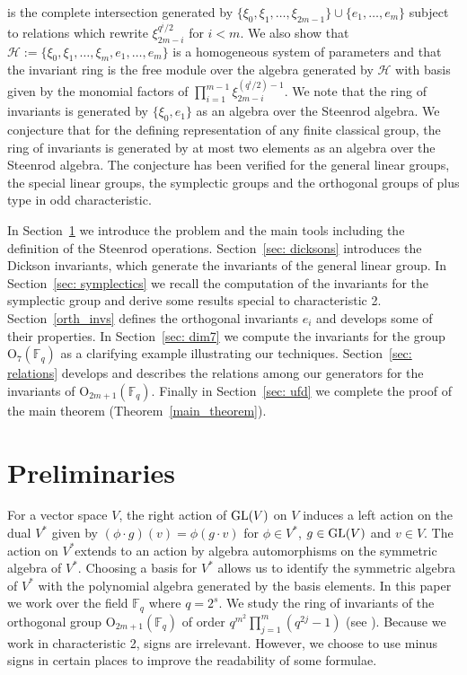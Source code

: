 \documentclass{amsart}
\newcommand{\field}{\mathbb{F}}
\newcommand{\orth}[2]{{{\text{O}_{{#1}}(\field_{#2})}}}
\newcommand{\h}{\mathcal{H}}
\begin{document}
is the complete intersection generated by 
$\{\xi_0,\xi_1,\ldots,\xi_{2m-1}\}\cup\{e_1,\ldots,e_m\}$
subject to relations which rewrite $\xi_{2m-i}^{q^i/2}$ for $i<m$.  
We also show that
$\h:=\{\xi_0,\xi_1,\ldots,\xi_m,e_1,\ldots, e_m\}$ is a homogeneous system of parameters and that the invariant ring is the free module over the algebra generated by $\h$ with basis given by the monomial factors of 
$\prod_{i=1}^{m-1} \xi_{2m-i}^{(q^i/2)-1}$.
We note that the ring of invariants is generated by $\{\xi_0,e_1\}$
as an algebra over the Steenrod algebra. We conjecture that
for the defining representation of any finite classical group,
the ring of invariants is generated by at most two elements  as an algebra over the Steenrod algebra. The conjecture has been verified for the general linear groups, the special linear groups, the symplectic groups and
the orthogonal groups of plus type in odd characteristic.

In Section~\ref{sec: preliminaries} we introduce the problem and the main tools 
including the definition of the Steenrod operations.  
Section~\ref{sec: dicksons} introduces the Dickson invariants, which 
generate the invariants of the general linear group.
In Section~\ref{sec: symplectics} we recall the computation of the invariants for the symplectic group and derive some results special
to characteristic 2.
Section~\ref{orth_invs} defines the orthogonal invariants $e_i$ and develops some of their properties.
In Section~\ref{sec: dim7} we compute the invariants for the group
$\orth{7}{q}$ as a clarifying example illustrating our techniques.
Section~\ref{sec: relations} develops and describes the relations among
our generators for the invariants of $\orth{2m+1}{q}$.
Finally in Section~\ref{sec: ufd} we complete the proof of the main theorem
(Theorem~\ref{main_theorem}).



\section{Preliminaries}\label{sec: preliminaries}

For a vector space $V$, the right action of ${\rm GL}(V)$
on $V$ induces a left action on the dual $V^*$ given by
$(\phi \cdot g)(v)=\phi(g\cdot v)$ for 
$\phi\in V^*$, $g\in {\rm GL}(V)$ and $v\in V$.
The action on $V^*$extends to an action by
algebra automorphisms on the symmetric algebra of $V^*$.
Choosing a basis for $V^*$ allows us to identify the symmetric algebra
of $V^*$ with the polynomial algebra generated by the basis elements.
 In this paper we work over the field $\field_q$ where $q=2^s$.
We study the ring of invariants of the orthogonal group $\orth{2m+1}{q}$ of order $q^{m^2}\prod_{j=1}^m(q^{2j}-1)$
(see \cite[page 81]{Taylor-ClassicalGroups:92}). 
Because we work in characteristic 2, signs are irrelevant.   However, we
choose to use minus signs in certain places to improve the readability 
of some formulae.
\end{document}
